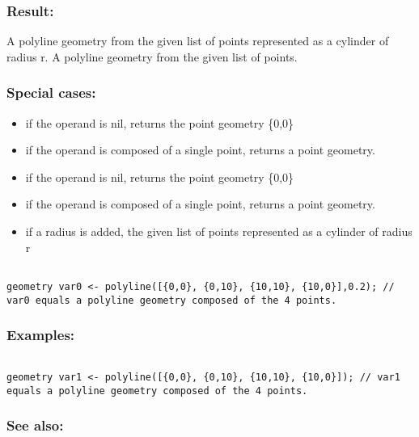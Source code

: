 \documentclass[]{book}
\providecommand{\tightlist}{%
  \setlength{\itemsep}{0pt}\setlength{\parskip}{0pt}}
\theoremstyle{definition}
\theoremstyle{definition}
\theoremstyle{definition}
\theoremstyle{remark}
\begin{document}
\subsubsection{Result:}\label{result-311}

A polyline geometry from the given list of points represented as a
cylinder of radius r. A polyline geometry from the given list of points.

\subsubsection{Special cases:}\label{special-cases-88}

\begin{itemize}
\tightlist
\item
  if the operand is nil, returns the point geometry \{0,0\}\\
\item
  if the operand is composed of a single point, returns a point
  geometry.\\
\item
  if the operand is nil, returns the point geometry \{0,0\}\\
\item
  if the operand is composed of a single point, returns a point
  geometry.\\
\item
  if a radius is added, the given list of points represented as a
  cylinder of radius r
\end{itemize}

\begin{verbatim}
 
geometry var0 <- polyline([{0,0}, {0,10}, {10,10}, {10,0}],0.2); // var0 equals a polyline geometry composed of the 4 points.
\end{verbatim}

\subsubsection{Examples:}\label{examples-223}

\begin{verbatim}
 
geometry var1 <- polyline([{0,0}, {0,10}, {10,10}, {10,0}]); // var1 equals a polyline geometry composed of the 4 points.
\end{verbatim}

\subsubsection{See also:}\label{see-also-125}
\end{document}
